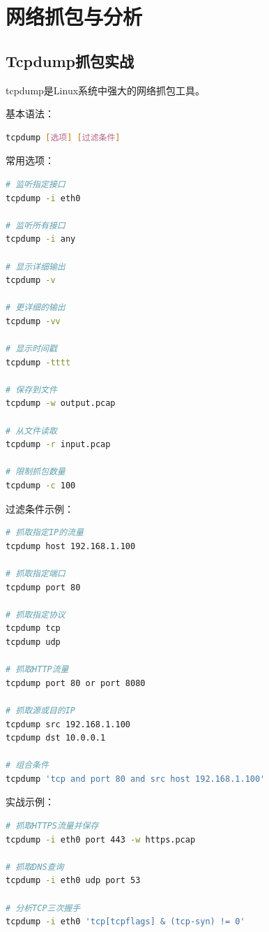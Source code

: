 \documentclass[12pt,UTF8]{ctexbook}
\begin{document}
\chapter{网络抓包与分析}
\label{chap:packet-analysis}

\section{Tcpdump抓包实战}
\label{sec:tcpdump}

tcpdump是Linux系统中强大的网络抓包工具。

基本语法：
\begin{lstlisting}[language=bash]
tcpdump [选项] [过滤条件]
\end{lstlisting}

常用选项：
\begin{lstlisting}[language=bash]
# 监听指定接口
tcpdump -i eth0

# 监听所有接口
tcpdump -i any

# 显示详细输出
tcpdump -v

# 更详细的输出
tcpdump -vv

# 显示时间戳
tcpdump -tttt

# 保存到文件
tcpdump -w output.pcap

# 从文件读取
tcpdump -r input.pcap

# 限制抓包数量
tcpdump -c 100
\end{lstlisting}

过滤条件示例：
\begin{lstlisting}[language=bash]
# 抓取指定IP的流量
tcpdump host 192.168.1.100

# 抓取指定端口
tcpdump port 80

# 抓取指定协议
tcpdump tcp
tcpdump udp

# 抓取HTTP流量
tcpdump port 80 or port 8080

# 抓取源或目的IP
tcpdump src 192.168.1.100
tcpdump dst 10.0.0.1

# 组合条件
tcpdump 'tcp and port 80 and src host 192.168.1.100'
\end{lstlisting}

实战示例：
\begin{lstlisting}[language=bash]
# 抓取HTTPS流量并保存
tcpdump -i eth0 port 443 -w https.pcap

# 抓取DNS查询
tcpdump -i eth0 udp port 53

# 分析TCP三次握手
tcpdump -i eth0 'tcp[tcpflags] & (tcp-syn) != 0'
\end{lstlisting}
\end{document}
